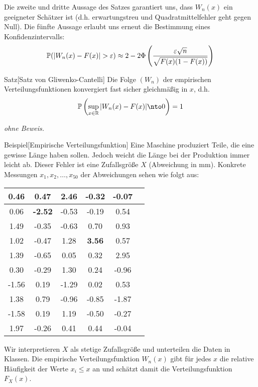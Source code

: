 Die zweite und dritte Aussage des Satzes garantiert uns, dass $W_n(x)$ ein geeigneter Schätzer ist
(d.h. erwartungstreu und Quadratmittelfehler geht gegen Null).
Die fünfte Aussage erlaubt uns erneut die Bestimmung eines Konfidenzintervalls:
\[
    \P(|W_n(x)-F(x)|>\varepsilon) \approx 2-2\Phi\left(\dfrac{\varepsilon\sqrt{n}}{\sqrt{F(x)(1-F(x))}}\right)
\]

\begin{colbox}{Satz}[Satz von Gliwenko-Cantelli]
    Die Folge $(W_n)$ der empirischen Verteilungsfunktionen konvergiert fast sicher gleichmäßig in $x$, d.h. 
    \[
        \P\left(\sup_{x\in\R}|W_n(x)-F(x)|\nto 0\right) = 1
    \]
\end{colbox}
\textit{ohne Beweis.}

\begin{colbox}{Beispiel}[Empirische Verteilungsfunktion]
    Eine Maschine produziert Teile, die eine gewisse Länge haben sollen. Jedoch weicht die Länge bei der Produktion immer leicht ab. Dieser Fehler ist eine Zufallsgröße $X$ (Abweichung in mm). Konkrete Messungen $x_1, x_2, \dots, x_{50}$ der Abweichungen sehen wie folgt aus:

    \begin{center}
    \begin{tabular}{|c|c|c|c|c|c|}
        \hline
        0.46 & 0.47 & 2.46 & -0.32 & -0.07 \\
        \hline
        0.06 & \textbf{-2.52} & -0.53 & -0.19 & 0.54 \\
        \hline
        1.49 & -0.35 & -0.63 & 0.70 & 0.93 \\
        \hline
        1.02 & -0.47 & 1.28 & \textbf{3.56} & 0.57 \\
        \hline
        1.39 & -0.65 & 0.05 & 0.32 & 2.95 \\
        \hline
        0.30 & -0.29 & 1.30 & 0.24 & -0.96 \\
        \hline
        -1.56 & 0.19 & -1.29 & 0.02 & 0.53 \\
        \hline
        1.38 & 0.79 & -0.96 & -0.85 & -1.87 \\
        \hline
        -1.58 & 0.19 & 1.19 & -0.50 & -0.27 \\
        \hline
        1.97 & -0.26 & 0.41 & 0.44 & -0.04 \\
        \hline
    \end{tabular}
    \end{center}

    Wir interpretieren $X$ als stetige Zufallsgröße und unterteilen die Daten in Klassen. 
    Die empirische Verteilungsfunktion $W_n(x)$ gibt für jedes $x$ die relative Häufigkeit der Werte $x_i \leq x$ 
    an und schätzt damit die Verteilungsfunktion $F_X(x)$.


\end{colbox}
